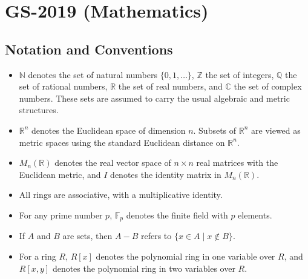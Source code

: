 \documentclass[11pt, a4paper]{article}
\begin{document}
\newpage

\section{GS-2019 (Mathematics)}

\subsection*{Notation and Conventions}
\begin{itemize}
  \item $\mathbb{N}$ denotes the set of natural numbers $\{0, 1, \dots\}$, $\mathbb{Z}$ the set of integers, $\mathbb{Q}$ the set of rational numbers, $\mathbb{R}$ the set of real numbers, and $\mathbb{C}$ the set of complex numbers. These sets are assumed to carry the usual algebraic and metric structures.
  \item $\mathbb{R}^n$ denotes the Euclidean space of dimension $n$. Subsets of $\mathbb{R}^n$ are viewed as metric spaces using the standard Euclidean distance on $\mathbb{R}^n$.
  \item $M_n(\mathbb{R})$ denotes the real vector space of $n \times n$ real matrices with the Euclidean metric, and $I$ denotes the identity matrix in $M_n(\mathbb{R})$.
  \item All rings are associative, with a multiplicative identity.
  \item For any prime number $p$, $\mathbb{F}_p$ denotes the finite field with $p$ elements.
  \item If $A$ and $B$ are sets, then $A - B$ refers to $\{x \in A \mid x \notin B\}$.
  \item For a ring $R$, $R[x]$ denotes the polynomial ring in one variable over $R$, and $R[x, y]$ denotes the polynomial ring in two variables over $R$.
\end{itemize}
\end{document}
